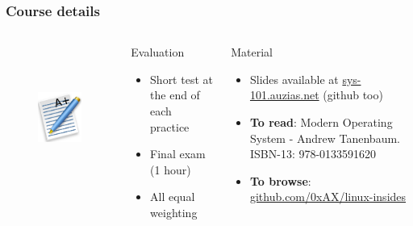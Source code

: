   \begin{frame}
    \frametitle{Course details}
    \begin{columns}
        \begin{figure}[t]
          \centering
          \includegraphics[height=4cm]{./imgs/grade.pdf}
          \label{fig:marks}
        \end{figure}
        \begin{block}{Evaluation}
          \begin{itemize}
            \item Short test at the end of each practice
            \item Final exam (1 hour)
            \item All equal weighting
          \end{itemize}
        \end{block}
        \begin{block}{Material}
          \begin{itemize}
            \item Slides available at \color{blue}\href{http://sys-101.auzias.net}{sys-101.auzias.net} \color{black} (github too)
            \item \textbf{To read}: Modern Operating System - Andrew Tanenbaum.  ISBN-13: 978-0133591620
            \item \textbf{To browse}: \color{blue}\href{https://github.com/0xAX/linux-insides}{github.com/0xAX/linux-insides}\color{black}
          \end{itemize}
        \end{block}
    \end{columns}
  \end{frame}
